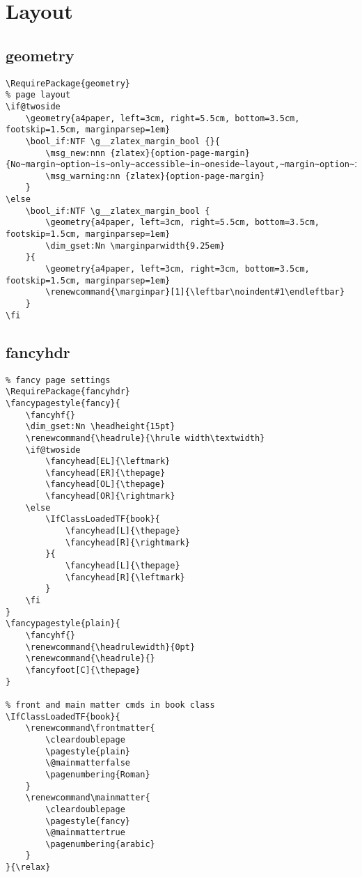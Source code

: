 \section{Layout}
\subsection{geometry}
\begin{verbatim}
\RequirePackage{geometry}
% page layout 
\if@twoside 
    \geometry{a4paper, left=3cm, right=5.5cm, bottom=3.5cm, footskip=1.5cm, marginparsep=1em}
    \bool_if:NTF \g__zlatex_margin_bool {}{
        \msg_new:nnn {zlatex}{option-page-margin}{No~margin~option~is~only~accessible~in~oneside~layout,~margin~option~is~now~enabled~by~default.} 
        \msg_warning:nn {zlatex}{option-page-margin}
    }
\else 
    \bool_if:NTF \g__zlatex_margin_bool {
        \geometry{a4paper, left=3cm, right=5.5cm, bottom=3.5cm, footskip=1.5cm, marginparsep=1em}
        \dim_gset:Nn \marginparwidth{9.25em}
    }{
        \geometry{a4paper, left=3cm, right=3cm, bottom=3.5cm, footskip=1.5cm, marginparsep=1em}
        \renewcommand{\marginpar}[1]{\leftbar\noindent#1\endleftbar}
    }
\fi
\end{verbatim}

\subsection{fancyhdr}
\begin{verbatim}
% fancy page settings
\RequirePackage{fancyhdr}
\fancypagestyle{fancy}{
    \fancyhf{}  
    \dim_gset:Nn \headheight{15pt}
    \renewcommand{\headrule}{\hrule width\textwidth}
    \if@twoside
        \fancyhead[EL]{\leftmark}
        \fancyhead[ER]{\thepage}
        \fancyhead[OL]{\thepage}
        \fancyhead[OR]{\rightmark}
    \else
        \IfClassLoadedTF{book}{
            \fancyhead[L]{\thepage}
            \fancyhead[R]{\rightmark}
        }{
            \fancyhead[L]{\thepage}
            \fancyhead[R]{\leftmark}
        }
    \fi
}
\fancypagestyle{plain}{
    \fancyhf{}  
    \renewcommand{\headrulewidth}{0pt}
    \renewcommand{\headrule}{}
    \fancyfoot[C]{\thepage}
}

% front and main matter cmds in book class
\IfClassLoadedTF{book}{
    \renewcommand\frontmatter{
        \cleardoublepage
        \pagestyle{plain}
        \@mainmatterfalse
        \pagenumbering{Roman}
    }
    \renewcommand\mainmatter{
        \cleardoublepage
        \pagestyle{fancy}
        \@mainmattertrue
        \pagenumbering{arabic}
    }
}{\relax}
\end{verbatim}


